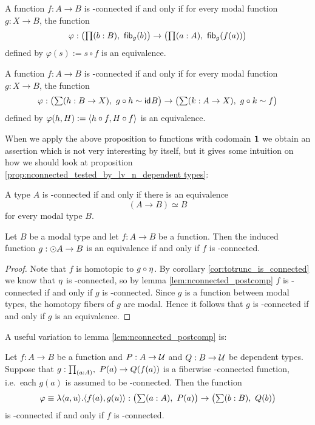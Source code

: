 \begin{cor}
A function $f:A\to B$ is \modal-connected if and only if for every modal function $g:X\to B$, the function
\begin{equation*}
\varphi:\big(\prd{b:B}\hfib{g}b\big)\to\big(\prd{a:A} \hfib{g}{f(a)}\big)
\end{equation*}
defined by $\varphi(s):=s\circ f$ is an equivalence.
\end{cor}

\begin{cor}
A function $f:A\to B$ is \modal-connected if and only if for every modal function $g:X\to B$, the function
\begin{equation*}
\varphi :\big(\sm{h:B\to X} g\circ h\sim \idfunc{B}\big)\to\big(\sm{k:A\to X} g\circ k\sim f\big)
\end{equation*}
defined by $\varphi(h,H):={\langle h\circ f,H\circ f\rangle}$ is an equivalence.
\end{cor}

When we apply the above proposition to functions with codomain $\mathbf{1}$ we obtain an assertion which is not very
interesting by itself, but it gives some intuition on how we should look at proposition \ref{prop:nconnected_tested_by_lv_n_dependent
types}:

\begin{cor}
A type $A$ is \modal-connected if and only if there is an equivalence
\begin{equation*}
(A\to B)\simeq B
\end{equation*}
for every modal type $B$.
\end{cor}

\begin{lem}\label{lem:nconnected_to_leveln_to_equiv}
Let $B$ be a modal type and let $f:A\to B$ be a function. Then the induced function $g:\odot A\to B$ is an
equivalence if and only if $f$ is \modal-connected.
\end{lem}

\begin{proof}
Note that $f$ is homotopic to $g\circ\eta$. By corollary \ref{cor:totrunc_is_connected} we know that $\eta$ is \modal-connected, so
by
lemma \ref{lem:nconnected_postcomp} $f$ is \modal-connected if and only if $g$ is \modal-connected. Since $g$ is a function between
modal types, the homotopy fibers of $g$ are modal. Hence it follows that $g$ is \modal-connected if and only if $g$ is an equivalence.
\end{proof}

A useful variation to lemma \ref{lem:nconnected_postcomp} is:
\begin{lem}\label{lem:nconnected_postcomp_variation}
Let $f:A\to B$ be a function and $P:A\to\mathcal{U}$ and $Q:B\to\mathcal{U}$ be dependent types. Suppose that $g:\prd{a:A},\ P(a)\to Q(f(a))$
is a fiberwise \modal-connected function, i.e.\ each $g(a)$ is assumed to be \modal-connected. Then the function
\begin{equation*}
\varphi\equiv\lambda\pairr{a,u}.\pairr{f(a),g(u)}:\big(\sm{a:A} P(a)\big)\to\big(\sm{b:B} Q(b)\big)
\end{equation*}
is \modal-connected if and only if $f$ is \modal-connected.
\end{lem}

